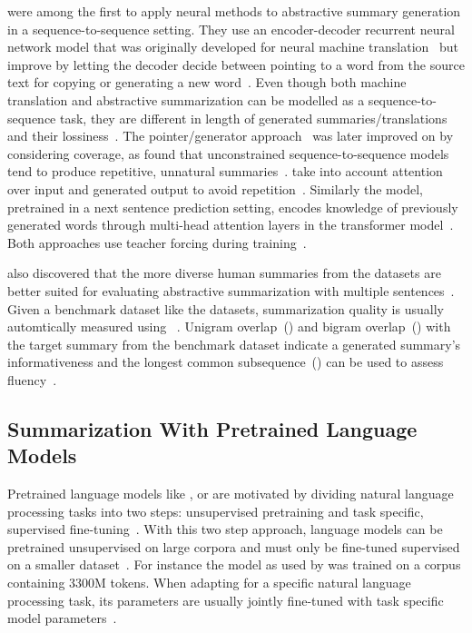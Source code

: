 \citeauthor{NallapatiZSGX2016} were among the first to apply neural methods to abstractive summary generation in a sequence-to-sequence setting. They use an encoder-decoder recurrent neural network model that was originally developed for neural machine translation~\cite{BahdanauCB2014} but improve by letting the decoder decide between pointing to a word from the source text for copying or generating a new word~\cite{NallapatiZSGX2016}.
Even though both machine translation and abstractive summarization can be modelled as a sequence-to-sequence task, they are different in length of generated summaries/translations and their lossiness~\cite{NallapatiZSGX2016}.
The pointer/generator approach~\cite{NallapatiZSGX2016} was later improved on by considering coverage, as \citeauthor{SeeLM2017} found that unconstrained sequence-to-sequence models tend to produce repetitive, unnatural summaries~\cite{SeeLM2017,PaulusXS2018}.
\citeauthor{PaulusXS2018} take into account attention over input and generated output to avoid repetition~\cite{PaulusXS2018}.
Similarly the \Bert model, pretrained in a next sentence prediction setting, encodes knowledge of previously generated words through multi-head attention layers in the transformer model~\cite{DevlinCLT2019,VaswaniSPUJGKP2017}.
Both approaches use teacher forcing during training~\cite{PaulusXS2018,DevlinCLT2019}.

\citeauthor{NallapatiZSGX2016} also discovered that the more diverse human summaries from the \CnnDailyMail datasets are better suited for evaluating abstractive summarization with multiple sentences~\cite{NallapatiZSGX2016,HermannKGEKSB2015}.
Given a benchmark dataset like the \CnnDailyMail datasets, summarization quality is usually automtically measured using \Rouge~\cite{Lin2004}.
Unigram overlap~() and bigram overlap~() with the target summary from the benchmark dataset indicate a generated summary's informativeness and the longest common subsequence~(\RougeL) can be used to assess fluency~\cite{LiuL2019,Lin2004}.

\subsection{Summarization With Pretrained Language Models}

Pretrained language models like \Elmo, \Gpt or \Bert are motivated by dividing natural language processing tasks into two steps: unsupervised pretraining and task specific, supervised fine-tuning~\cite{PetersNIGCLZ2018,RadfordNSS2018,DevlinCLT2019}.
With this two step approach, language models can be pretrained unsupervised on large corpora and must only be fine-tuned supervised on a smaller dataset~\cite{DevlinCLT2019}.
For instance the \BertBase model as used by \citeauthor{LiuL2019} was trained on a corpus containing 3300M tokens.
When adapting \Bert for a specific natural language processing task, its parameters are usually jointly fine-tuned with task specific model parameters~\cite{DevlinCLT2019,LiuL2019}.

